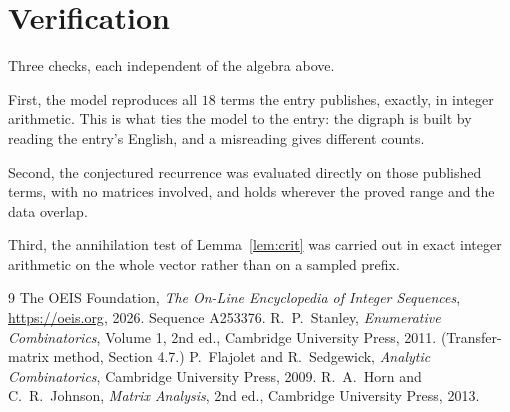 \documentclass[11pt,a4paper]{article}
\theoremstyle{plain}
\theoremstyle{definition}
\begin{document}
\section{Verification}

Three checks, each independent of the algebra above.

First, the model reproduces all $18$ terms the entry publishes, exactly, in integer
arithmetic. This is what ties the model to the entry: the digraph is built by reading the
entry's English, and a misreading gives different counts.

Second, the conjectured recurrence was evaluated directly on those published terms, with no
matrices involved, and holds wherever the proved range and the data overlap.

Third, the annihilation test of Lemma~\ref{lem:crit} was carried out in exact integer
arithmetic on the whole vector rather than on a sampled prefix.

\begin{thebibliography}{9}
 The OEIS Foundation, \emph{The On-Line Encyclopedia of Integer
Sequences}, \url{https://oeis.org}, 2026. Sequence A253376.
 R.~P.~Stanley, \emph{Enumerative Combinatorics}, Volume 1, 2nd ed.,
Cambridge University Press, 2011. (Transfer-matrix method, Section 4.7.)
 P.~Flajolet and R.~Sedgewick, \emph{Analytic Combinatorics}, Cambridge
University Press, 2009.
 R.~A.~Horn and C.~R.~Johnson, \emph{Matrix Analysis}, 2nd ed., Cambridge
University Press, 2013.
\end{thebibliography}
\end{document}

